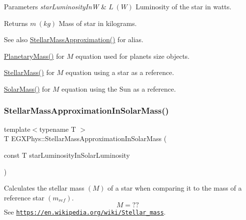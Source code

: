 \begin{DoxyParams}{Parameters}
{\em star\+Luminosity\+InW} & $L\ (W)$ Luminosity of the star in watts. \\
\hline
\end{DoxyParams}
\begin{DoxyReturn}{Returns}
$m\ (kg)$ Mass of star in kilograms. 
\end{DoxyReturn}
\begin{DoxySeeAlso}{See also}
\mbox{\hyperlink{group___e_g_x_phys-_stellar_mass_ga5eeb9652876859bff3afdd352dd7925e}{Stellar\+Mass\+Approximation()}} for alias. 

\mbox{\hyperlink{group___e_g_x_phys-_planetary_mass_ga225bcf56fb37468f6d4d46493d403503}{Planetary\+Mass()}} for $M$ equation used for planets size objects. 

\mbox{\hyperlink{group___e_g_x_phys-_stellar_mass_ga6c1b42cfd62e3174709ddbf15a87b460}{Stellar\+Mass()}} for $M$ equation using a star as a reference. 

\mbox{\hyperlink{group___e_g_x_phys-_stellar_mass_ga4988f903a27ec9cfa63f72b003d876fd}{Solar\+Mass()}} for $M$ equation using the Sun as a reference. 
\end{DoxySeeAlso}
\mbox{\label{group___e_g_x_phys-_stellar_mass_ga8d4792aff66d53698461f73b1d25e3cc}} 
\subsubsection{\texorpdfstring{Stellar\+Mass\+Approximation\+In\+Solar\+Mass()}{StellarMassApproximationInSolarMass()}}
{\footnotesize\ttfamily template$<$typename T $>$ \\
T E\+G\+X\+Phys\+::\+Stellar\+Mass\+Approximation\+In\+Solar\+Mass (\begin{DoxyParamCaption}\item[{const T}]{star\+Luminosity\+In\+Solar\+Luminosity }\end{DoxyParamCaption})}



Calculates the stellar mass $(M)$ of a star when comparing it to the mass of a reference star $(m_{ref})$. \[M=??\] See \href{https://en.wikipedia.org/wiki/Stellar_mass}{\tt https\+://en.\+wikipedia.\+org/wiki/\+Stellar\+\_\+mass}. 


